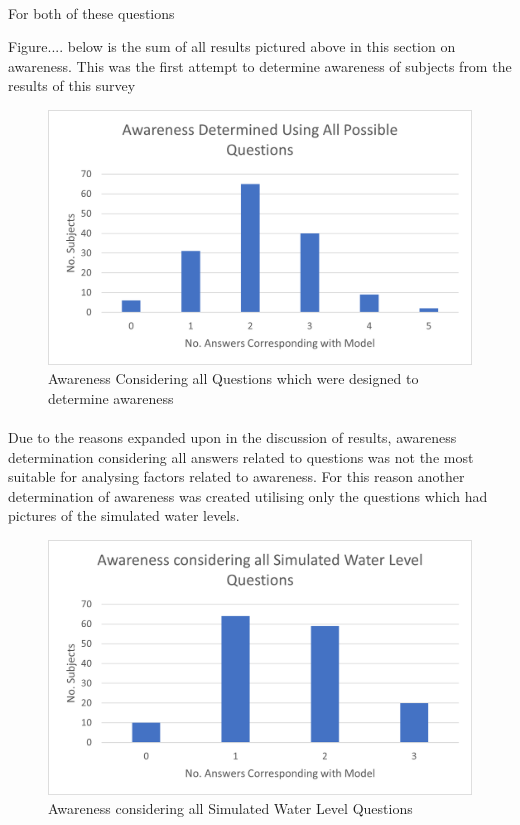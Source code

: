 \paragraph{}

For both of these questions 

Figure.... below is the sum of all results pictured above in this section on awareness. This was the first attempt to determine awareness of subjects from the results of this survey

\begin{figure}[h]
    \centering
    \includegraphics{fig_results/aware_all.png}
    \caption{Awareness Considering all Questions which were designed to determine awareness}
    \label{fig:aware-all}
\end{figure}
\paragraph{}

Due to the reasons expanded upon in the discussion of results, awareness determination considering all answers related to questions was not the most suitable for analysing factors related to awareness. For this reason another determination of awareness was created utilising only the questions which had pictures of the simulated water levels. 

\begin{figure}[h]
    \centering
    \includegraphics{fig_results/Awareness_ all_simulation_pictures_qs.png}
    \caption{Awareness considering all Simulated Water Level Questions}
    \label{fig:aware_all}
\end{figure}

